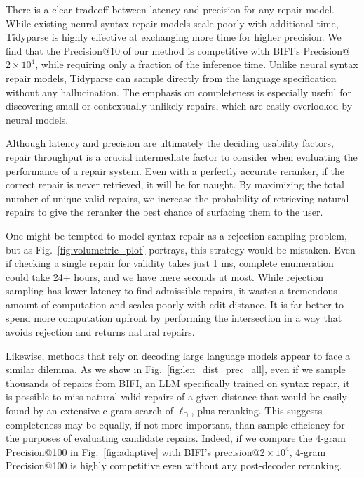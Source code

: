 \documentclass[sigplan,review,acmsmall,nonacm,screen,anonymous]{acmart}\settopmatter{printfolios=false,printccs=false,printacmref=false}
\begin{document}
There is a clear tradeoff between latency and precision for any repair model. While existing neural syntax repair models scale poorly with additional time, Tidyparse is highly effective at exchanging more time for higher precision. We find that the Precision@10 of our method is competitive with BIFI's Precision@$2\times 10^4$, while requiring only a fraction of the inference time. Unlike neural syntax repair models, Tidyparse can sample directly from the language specification without any hallucination. The emphasis on completeness is especially useful for discovering small or contextually unlikely repairs, which are easily overlooked by neural models.

Although latency and precision are ultimately the deciding usability factors, repair throughput is a crucial intermediate factor to consider when evaluating the performance of a repair system. Even with a perfectly accurate reranker, if the correct repair is never retrieved, it will be for naught. By maximizing the total number of unique valid repairs, we increase the probability of retrieving natural repairs to give the reranker the best chance of surfacing them to the user.

One might be tempted to model syntax repair as a rejection sampling problem, but as Fig.~\ref{fig:volumetric_plot} portrays, this strategy would be mistaken. Even if checking a single repair for validity takes just 1 ms, complete enumeration could take 24+ hours, and we have mere seconds at most. While rejection sampling has lower latency to find admissible repairs, it wastes a tremendous amount of computation and scales poorly with edit distance. It is far better to spend more computation upfront by performing the intersection in a way that avoids rejection and returns natural repairs.

Likewise, methods that rely on decoding large language models appear to face a similar dilemma. As we show in Fig.~\ref{fig:len_dist_prec_all}, even if we sample thousands of repairs from BIFI, an LLM specifically trained on syntax repair, it is possible to miss natural valid repairs of a given distance that would be easily found by an extensive c-gram search of $\ell_\cap$, plus reranking. This suggests completeness may be equally, if not more important, than sample efficiency for the purposes of evaluating candidate repairs. Indeed, if we compare the 4-gram Precision@100 in Fig.~\ref{fig:adaptive} with BIFI's precision@$2\times 10^4$, 4-gram Precision@100 is highly competitive even without any post-decoder reranking.
\end{document}
